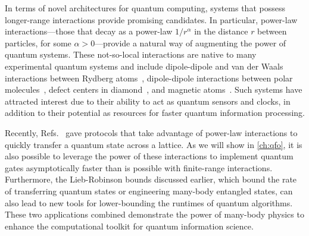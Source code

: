 In terms of novel architectures for quantum computing, systems that possess longer-range interactions provide promising candidates.
In particular, power-law interactions---those that decay as a power-law $1/r^\alpha$ in the distance  $r$ between particles, for some $\alpha > 0$---provide a natural way of augmenting the power of quantum systems.
These not-so-local interactions are native to many experimental quantum systems and include dipole-dipole and van der Waals interactions between Rydberg atoms~\cite{Saffman2010,Weimer2012}, dipole-dipole interactions between polar molecules~\cite{Yan2013}, defect centers in diamond~\cite{Yao2012,Weimer2012}, and magnetic atoms~\cite{Fraxanet2022}.
Such systems have attracted interest due to their ability to act as quantum sensors \cite{Foss-Feig15} and clocks, in addition to their potential as resources for faster quantum information processing.

Recently, Refs.~\cite{kuwaharaStrictlyLinearLight2020,Eldredge2017,Guo2022,Tran2021a} gave protocols that take advantage of power-law interactions to quickly transfer a quantum state across a lattice.
As we will show in \cref{ch:qfo}, it is also possible to leverage the power of these interactions to implement quantum gates asymptotically faster than is possible with finite-range interactions.
Furthermore, the Lieb-Robinson bounds discussed earlier, which bound the rate of transferring quantum states or engineering many-body entangled states, can also lead to new tools for lower-bounding the runtimes of quantum algorithms.
These two applications combined demonstrate the power of many-body physics to enhance the computational toolkit for quantum information science.


